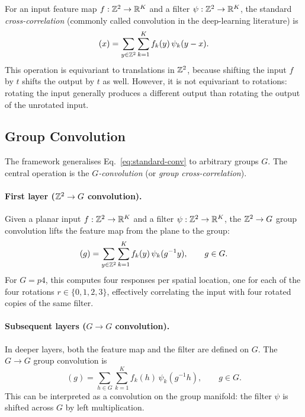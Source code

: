 For an input feature map \(f: \mathbb{Z}^2 \to \mathbb{R}^K\) and a filter \(\psi: \mathbb{Z}^2 \to \mathbb{R}^K\),
the standard \emph{cross-correlation} (commonly called convolution in the deep-learning
literature) is
\begin{equation}
  [f \star \psi](x) = \sum_{y \in \Z^2} \sum_{k=1}^{K} f_k(y)\,\psi_k(y - x).
  \label{eq:standard-conv}
\end{equation}
This operation is equivariant to translations in \(\mathbb{Z}^2\), because shifting the input
\(f\) by \(t\) shifts the output by \(t\) as well. However, it is not equivariant to
rotations: rotating the input generally produces a different output than rotating the output
of the unrotated input.

\subsection{Group Convolution}

The \gcnn{} framework \citep{cohen2016group} generalises Eq.~\eqref{eq:standard-conv}
to arbitrary groups \(G\). The central operation is the \emph{\(G\)-convolution} (or
\emph{group cross-correlation}).

\paragraph{First layer (\(\mathbb{Z}^2 \to G\) convolution).}
Given a planar input \(f: \mathbb{Z}^2 \to \mathbb{R}^K\) and a filter \(\psi: \mathbb{Z}^2 \to \mathbb{R}^K\), the
\(\mathbb{Z}^2 \to G\) group convolution lifts the feature map from the plane to the group:
\begin{equation}
  [f \star_G \psi](g) = \sum_{y \in \Z^2} \sum_{k=1}^{K} f_k(y)\,\psi_k(g^{-1} y),
  \qquad g \in G.
  \label{eq:lift-conv}
\end{equation}
For \(G = p4\), this computes four responses per spatial location, one for each of the four
rotations \(r \in \{0,1,2,3\}\), effectively correlating the input with four rotated copies
of the same filter.

\paragraph{Subsequent layers (\(G \to G\) convolution).}
In deeper layers, both the feature map and the filter are defined on \(G\). The
\(G \to G\) group convolution is
\begin{equation}
  [f \star_G \psi](g) = \sum_{h \in G} \sum_{k=1}^{K} f_k(h)\,\psi_k(g^{-1} h),
  \qquad g \in G.
  \label{eq:group-conv}
\end{equation}
This can be interpreted as a convolution on the group manifold: the filter \(\psi\) is
shifted across \(G\) by left multiplication.

